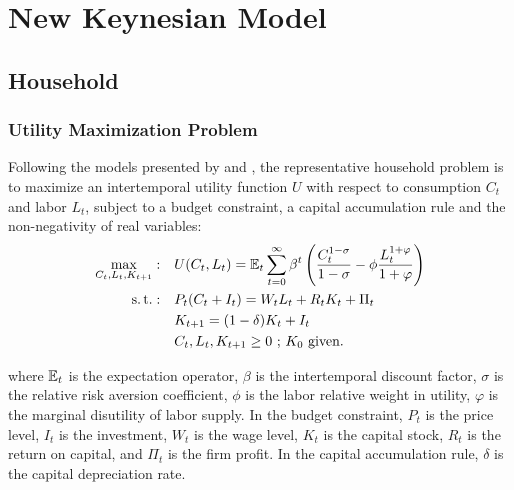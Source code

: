 \documentclass[
thesis.tex
]{subfiles}
\begin{document}
	
	\newpage
	
\section{New Keynesian Model}\label{sec_v0:nk-model}
	
	{
		\setlength{\parskip}{1pt}
		\singlespacing
		\localtableofcontents
	}

\newpage


	\subsection{Household}
	
	\subsubsection*{Utility Maximization Problem}
	
	
	Following the models presented by \textcite{costa_junior_understanding_2016} and \textcite{solis-garcia_ucb_2022}, the representative household problem is to maximize an intertemporal utility function $U$ with respect to consumption $C_t$ and labor $L_t$, subject to a budget constraint, a capital accumulation rule and the non-negativity of real variables:
	\begin{align}
		\label{eq_v0:household-utility-function}
		\max_{C_t,L_t,K_{t+1}}: \quad & U(C_t,L_t) = {\mathbb{E}_{t}} \sum_{t=0}^{\infty} \beta^t \left(\frac{C_t^{1-\sigma}}{1-\sigma} - \phi \frac{L_t^{1+\varphi}}{1+\varphi} \right) \\
		\label{eq_v0:household-budget-constraint}
		\operatorname{s.t.}: \quad & P_t (C_t + I_t) = W_t L_t + R_t K_t + \Pi_t \\
		\label{eq_v0:law-of-motion-for-capital}
		\quad & K_{t+1} = (1-\delta)K_t + I_t \\
		\quad & C_t,L_t,K_{t+1} \geq 0 \text{ ; $K_0$ given.} \nonumber
	\end{align}
	
	where ${\mathbb{E}_{t}}$ is the expectation operator, $\beta$ is the intertemporal discount factor, $\sigma$ is the relative risk aversion coefficient, $\phi$ is the labor relative weight in utility, $\varphi$ is the marginal disutility of labor supply. In the budget constraint, $P_t$ is the price level, $I_t$ is the investment, $W_t$ is the wage level, $K_t$ is the capital stock, $R_t$ is the return on capital, and $\Pi_t$ is the firm profit. In the capital accumulation rule, $\delta$ is the capital depreciation rate.
	
\end{document}

